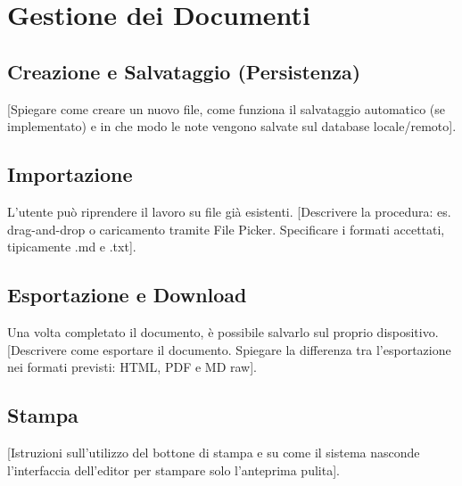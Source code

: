 \section{Gestione dei Documenti}

\subsection{Creazione e Salvataggio (Persistenza)}
[Spiegare come creare un nuovo file, come funziona il salvataggio automatico (se implementato) e in che modo le note vengono salvate sul database locale/remoto].

\subsection{Importazione}
L'utente può riprendere il lavoro su file già esistenti.
[Descrivere la procedura: es. drag-and-drop o caricamento tramite File Picker. Specificare i formati accettati, tipicamente .md e .txt].

\subsection{Esportazione e Download}
Una volta completato il documento, è possibile salvarlo sul proprio dispositivo.
[Descrivere come esportare il documento. Spiegare la differenza tra l'esportazione nei formati previsti: HTML, PDF e MD raw].

\subsection{Stampa}
[Istruzioni sull'utilizzo del bottone di stampa e su come il sistema nasconde l'interfaccia dell'editor per stampare solo l'anteprima pulita].